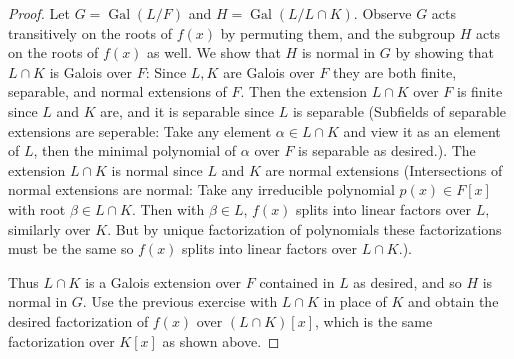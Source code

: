 \documentclass[11pt]{article}
\DeclareMathOperator{\Gal}{Gal}
\begin{document}
\begin{enumerate}
\begin{proof}
       Let $G = \Gal(L/F)$ and $H = \Gal(L/L\cap K)$. Observe $G$ acts transitively on the roots of $f(x)$ by permuting them, and the subgroup $H$ acts on the roots of $f(x)$ as well. We show that $H$ is normal in $G$ by showing that $L\cap K$ is Galois over $F$: Since $L,K$ are Galois over $F$ they are both finite, separable, and normal extensions of $F$. Then the extension $L\cap K$ over $F$ is finite since $L$ and $K$ are, and it is separable since $L$ is separable (Subfields of separable extensions are seperable: Take any element $\alpha\in L\cap K$ and view it as an element of $L$, then the minimal polynomial of $\alpha$ over $F$ is separable as desired.). The extension $L\cap K$ is normal since $L$ and $K$ are normal extensions (Intersections of normal extensions are normal: Take any irreducible polynomial $p(x)\in F[x]$ with root $\beta\in L\cap K$. Then with $\beta\in L$, $f(x)$ splits into linear factors over $L$, similarly over $K$. But by unique factorization of polynomials these factorizations must be the same so $f(x)$ splits into linear factors over $L\cap K$.).
       
       Thus $L\cap K$ is a Galois extension over $F$ contained in $L$ as desired, and so $H$ is normal in $G$.
       Use the previous exercise with $L\cap K$ in place of $K$ and obtain the desired factorization of $f(x)$ over $(L\cap K)[x]$, which is the same factorization over $K[x]$ as shown above.
    \end{proof}
\end{enumerate}
\end{document}
